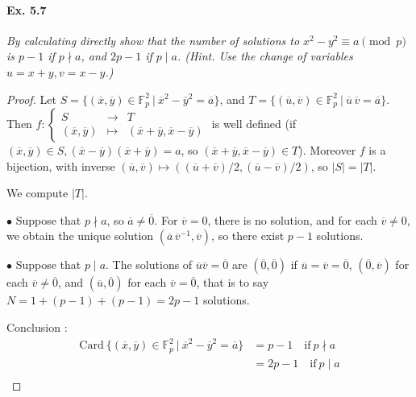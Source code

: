 \documentclass[11pt,a4paper]{article}
\newcommand{\F}{\mathbb{F}}
\begin{document}
\paragraph{Ex. 5.7}

{\it 
By calculating directly show that the number of solutions to $x^2 - y^2 \equiv a \pmod p$ is $p-1$ if $p \nmid a$, and $2p - 1$ if $p \mid a$. (Hint. Use the change of variables $u = x+y, v=x-y$.)

}

\begin{proof}
Let $S = \{(\overline{x},\overline{y}) \in \F_p^2\ \vert \ \overline{x}^2 - \overline{y}^2 = \overline{a}\}$, and $T = \{(\overline{u},\overline{v}) \in \F_p^2\ \vert \ \overline{u}\, \overline{v} = \overline{a}\}$.
Then 
$f:
\left\{
\begin{array}{ccc}
 S &  \to  &  T\\
  (\overline{x},\overline{y})&  \mapsto &  (\overline{x} + \overline{y},  \overline{x} - \overline{y})
\end{array}
\right.
$ is well defined (if $(\overline{x},\overline{y}) \in S, (\overline{x}-\overline{y})(\overline{x}+\overline{y}) =a$, so $(\overline{x} + \overline{y},  \overline{x} - \overline{y}) \in T$). Moreover $f$ is a bijection, with inverse $(\overline{u},\overline{v}) \mapsto  ((\overline{u}+ \overline{v})/2, (\overline{u}- \overline{v})/2)$, so $\vert S \vert = \vert T \vert$.

We compute $\vert T \vert$.

$\bullet$  Suppose that $p\nmid a$, so $\overline{a} \neq \overline{0}$. For $\overline{v} = {0}$, there is no solution, and for each $\overline{v} \neq 0$, we obtain the unique solution $(\overline{a} \, \overline{v}^{-1},\overline{v})$, so there exist $p-1$ solutions.

$\bullet$ Suppose that $p\mid a$. The solutions of $\overline{u} \overline{v} = \overline{0}$ are $(\overline{0},\overline{0})$ if $\overline{u} = \overline{v} = \overline{0}$, $(\overline{0},\overline{v})$ for each $\overline{v} \ne \overline{0}$, and $(\overline{u},\overline{0})$ for each $\overline{v} =\overline{0}$, that is to say $N = 1+(p-1)+(p-1) = 2p-1$ solutions.

Conclusion : 
\begin{align*}
\mathrm{Card} \ \{(\overline{x},\overline{y}) \in \F_p^2\ \vert \ \overline{x}^2 - \overline{y}^2 = \overline{a}\} &= p-1\quad \mathrm{if}\  p \nmid a\\
&= 2p-1 \quad \mathrm{if}\  p \mid a\\
\end{align*}
\end{proof}
\end{document}
